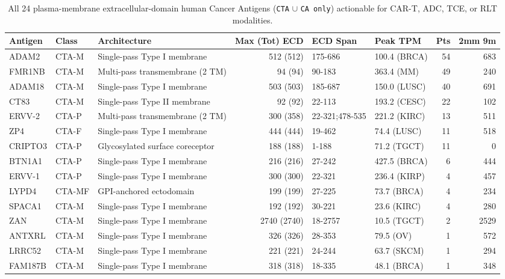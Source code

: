 \documentclass[10pt,letterpaper]{article}
\begin{document}
\begin{table}[htbp]
\centering
\scriptsize
\setlength{\tabcolsep}{3.5pt}
\caption{All 24 plasma-membrane extracellular-domain human Cancer Antigens (\texttt{CTA} $\cup$ \texttt{CA only}) actionable for CAR-T, ADC, TCE, or RLT modalities.}
\label{tab:surface}
\begin{tabularx}{\textwidth}{l l p{3.1cm} r p{2.3cm} p{2.3cm} r r}
\toprule
\textbf{Antigen} & \textbf{Class} & \textbf{Architecture} & \textbf{Max (Tot) ECD} & \textbf{ECD Span} & \textbf{Peak TPM} & \textbf{Pts} & \textbf{2mm 9m} \\
\midrule
ADAM2 & CTA-M & Single-pass Type I membrane & 512 (512) & 175-686 & 100.4 (BRCA) & 54 & 683 \\
FMR1NB & CTA-M & Multi-pass transmembrane (2 TM) & 94 (94) & 90-183 & 363.4 (MM) & 49 & 240 \\
ADAM18 & CTA-M & Single-pass Type I membrane & 503 (503) & 185-687 & 150.0 (LUSC) & 40 & 691 \\
CT83 & CTA-M & Single-pass Type II membrane & 92 (92) & 22-113 & 193.2 (CESC) & 22 & 102 \\
ERVV-2 & CTA-P & Multi-pass transmembrane (2 TM) & 300 (358) & 22-321;478-535 & 221.2 (KIRC) & 13 & 511 \\
ZP4 & CTA-F & Single-pass Type I membrane & 444 (444) & 19-462 & 74.4 (LUSC) & 11 & 518 \\
CRIPTO3 & CTA-P & Glycosylated surface coreceptor & 188 (188) & 1-188 & 71.2 (TGCT) & 11 & 0 \\
BTN1A1 & CTA-P & Single-pass Type I membrane & 216 (216) & 27-242 & 427.5 (BRCA) & 6 & 444 \\
ERVV-1 & CTA-P & Single-pass Type I membrane & 300 (300) & 22-321 & 236.4 (KIRP) & 4 & 457 \\
LYPD4 & CTA-MF & GPI-anchored ectodomain & 199 (199) & 27-225 & 73.7 (BRCA) & 4 & 234 \\
SPACA1 & CTA-M & Single-pass Type I membrane & 192 (192) & 30-221 & 23.6 (KIRC) & 4 & 280 \\
ZAN & CTA-M & Single-pass Type I membrane & 2740 (2740) & 18-2757 & 10.5 (TGCT) & 2 & 2529 \\
ANTXRL & CTA-M & Single-pass Type I membrane & 326 (326) & 28-353 & 79.5 (OV) & 1 & 572 \\
LRRC52 & CTA-M & Single-pass Type I membrane & 221 (221) & 24-244 & 63.7 (SKCM) & 1 & 294 \\
FAM187B & CTA-M & Single-pass Type I membrane & 318 (318) & 18-335 & 48.1 (BRCA) & 1 & 348 \\

\end{tabularx}
\end{table}
\end{document}
